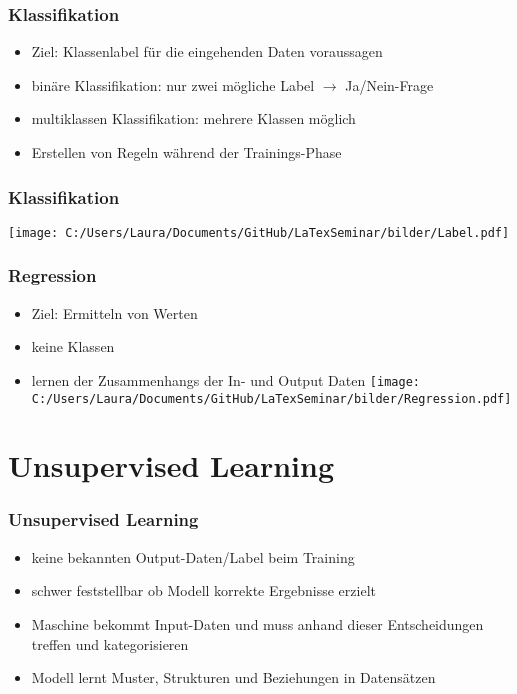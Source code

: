 \documentclass[11pt]{beamer}
\begin{document}
	\begin{frame}
		\frametitle{Klassifikation}
		\begin{itemize}
			\item Ziel: Klassenlabel für die eingehenden Daten voraussagen
			\item binäre Klassifikation: nur zwei mögliche Label $\rightarrow$ Ja/Nein-Frage
			\item multiklassen Klassifikation: mehrere Klassen möglich
			\item Erstellen von Regeln während der Trainings-Phase 
		\end{itemize}
		
	\end{frame}
	
	\begin{frame}
		\frametitle{Klassifikation}
		\centering
		\texttt{[image: C:/Users/Laura/Documents/GitHub/LaTexSeminar/bilder/Label.pdf]}
	\end{frame}
	
	\begin{frame}
		\frametitle{Regression}
		\begin{itemize}
			\item Ziel: Ermitteln von Werten
			\item keine Klassen
			\item lernen der Zusammenhangs der In- und Output Daten
			\texttt{[image: C:/Users/Laura/Documents/GitHub/LaTexSeminar/bilder/Regression.pdf]}
		\end{itemize}
		
	\end{frame}
	
	\section{Unsupervised Learning}
	
	\begin{frame}
		\frametitle{Unsupervised Learning}
		\begin{itemize}
			\item keine bekannten Output-Daten/Label beim Training
			\item schwer feststellbar ob Modell korrekte Ergebnisse erzielt
			\item Maschine bekommt Input-Daten und muss anhand dieser Entscheidungen treffen und kategorisieren
			\item Modell lernt Muster, Strukturen und Beziehungen in Datensätzen
		\end{itemize}
	\end{frame}
	
\end{document}
